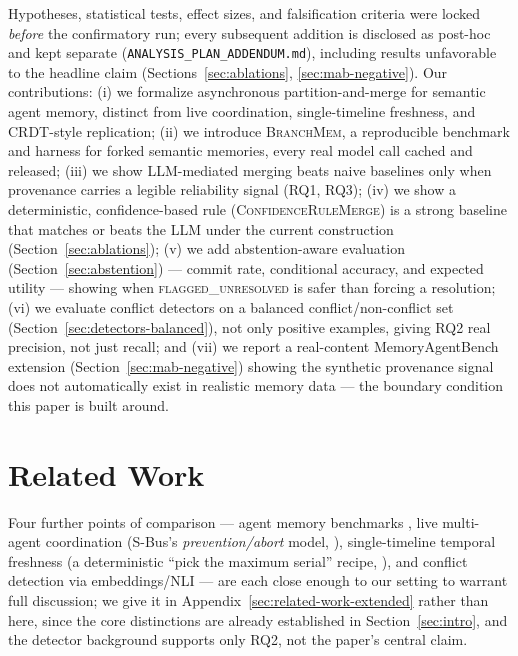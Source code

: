 \documentclass[11pt]{article}
\begin{document}
Hypotheses, statistical tests, effect sizes, and falsification criteria
were locked \emph{before} the confirmatory run; every subsequent addition
is disclosed as post-hoc and kept separate
(\texttt{ANALYSIS\_PLAN\_ADDENDUM.md}), including results unfavorable to the
headline claim (Sections~\ref{sec:ablations}, \ref{sec:mab-negative}). Our
contributions: (i) we formalize asynchronous partition-and-merge for semantic agent
memory, distinct from live coordination, single-timeline freshness, and
CRDT-style replication; (ii) we introduce \textsc{BranchMem}, a
reproducible benchmark and harness for forked semantic memories, every
real model call cached and released; (iii) we show LLM-mediated merging
beats naive baselines only when provenance carries a legible reliability
signal (RQ1, RQ3); (iv) we show a deterministic, confidence-based rule
(\textsc{ConfidenceRuleMerge}) is a strong baseline that matches or beats
the LLM under the current construction (Section~\ref{sec:ablations});
(v) we add abstention-aware evaluation (Section~\ref{sec:abstention}) ---
commit rate, conditional accuracy, and expected utility --- showing when
\textsc{flagged\_unresolved} is safer than forcing a resolution;
(vi) we evaluate conflict detectors on a balanced conflict/non-conflict set
(Section~\ref{sec:detectors-balanced}), not only positive examples, giving
RQ2 real precision, not just recall; and (vii) we report a real-content
MemoryAgentBench extension (Section~\ref{sec:mab-negative}) showing the
synthetic provenance signal does not automatically exist in realistic
memory data --- the boundary condition this paper is built around.

\section{Related Work}
\label{sec:related-work}

Four further points of comparison --- agent memory benchmarks
\citep{shinn2023reflexion,packer2023memgpt,hu2025memoryagentbench}, live
multi-agent coordination (S-Bus's \emph{prevention/abort} model,
\citealp{khan2026sbus}), single-timeline temporal freshness (a
deterministic ``pick the maximum serial'' recipe,
\citealp{reddy2026freshness}), and conflict detection via embeddings/NLI
\citep{longpre2021knowledge,lewis2020rag,reimers2019sentencebert} --- are
each close enough to our setting to warrant full discussion; we give it in
Appendix~\ref{sec:related-work-extended} rather than here, since the core
distinctions are already established in Section~\ref{sec:intro}, and the
detector background supports only RQ2, not the paper's central claim.
\end{document}
